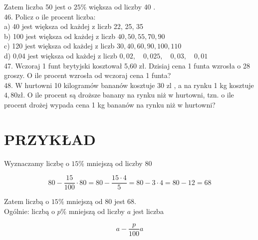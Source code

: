 \documentclass[10pt]{article}
\begin{document}
Zatem liczba 50 jest o \(25 \%\) większa od liczby 40 .\\
46. Policz o ile procent liczba:\\
a) 40 jest większa od każdej z liczb 22, 25, 35\\
b) 100 jest większa od każdej z liczb \(40,50,55,70,90\)\\
c) 120 jest większa od każdej z liczb \(30,40,60,90,100,110\)\\
d) 0,04 jest większa od każdej z liczb \(0,02, \quad 0,025, \quad 0,03, \quad 0,01\)\\
47. Wczoraj 1 funt brytyjski kosztował 5,60 zł. Dzisiaj cena 1 funta wzrosła o 28 groszy. O ile procent wzrosła od wczoraj cena 1 funta?\\
48. W hurtowni 10 kilogramów bananów kosztuje 30 zl , a na rynku 1 kg kosztuje \(4,80 \mathrm{zł}\). O ile procent są droższe banany na rynku niż w hurtowni, tzn. o ile procent drożej wypada cena 1 kg bananów na rynku niż w hurtowni?

\section*{PRZYKŁAD}
Wyznaczamy liczbę o \(15 \%\) mniejszą od liczby 80

\[
80-\frac{15}{100} \cdot 80=80-\frac{15 \cdot 4}{5}=80-3 \cdot 4=80-12=68
\]

Zatem liczbą o \(15 \%\) mniejszą od 80 jest 68.\\
Ogólnie: liczbą o \(p \%\) mniejszą od liczby \(a\) jest liczba

\[
a-\frac{p}{100} a
\]
\end{document}
